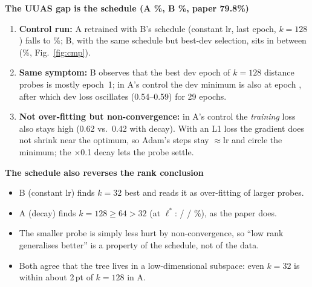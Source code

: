 \documentclass[11pt,a4paper]{article}
\newcommand{\lstar}{\ensuremath{\ell^*}}
\newcommand{\pt}{\,pt}
\newcommand{\blk}[1]{\par\needspace{5\baselineskip}\smallskip\noindent\textbf{#1}\par\nobreak\vspace{1pt}}
\begin{document}
\blk{The UUAS gap is the schedule (A \TtwoTestUuas\%, B \BUUASnp\%, paper 79.8\%)}
\begin{enumerate}
\item \textbf{Control run:} A retrained with B's schedule (constant lr, last epoch, $k=128$) falls to \ALitUUASonetwoeight\%; B, with the same
schedule but best-dev selection, sits in between (\BUUASnp\%, Fig.~\ref{fig:cmp}).
\item \textbf{Same symptom:} B observes that the best dev epoch of $k=128$ distance probes is mostly epoch~1; in A's control the dev minimum is
also at epoch \LitMinEpoch, after which dev loss oscillates (0.54--0.59) for 29 epochs.
\item \textbf{Not over-fitting but non-convergence:} in A's control the \emph{training} loss also stays high (0.62 vs.\ 0.42 with decay).
With an L1 loss the gradient does not shrink near the optimum, so Adam's steps stay $\approx$lr and circle the minimum; the $\times$0.1
decay lets the probe settle.
\end{enumerate}

\blk{The schedule also reverses the rank conclusion}
\begin{itemize}
\item B (constant lr) finds $k=32$ best and reads it as over-fitting of larger probes.
\item A (decay) finds $k=128 \ge 64 > 32$ (at \lstar: \RankAUUAS{} / \RankBUUAS{} / \RankCUUAS\%), as the paper does.
\item The smaller probe is simply less hurt by non-convergence, so ``low rank generalises better'' is a property of the schedule, not of the data.
\item Both agree that the tree lives in a low-dimensional subspace: even $k=32$ is within about 2\pt{} of $k=128$ in A.
\end{itemize}
\end{document}
